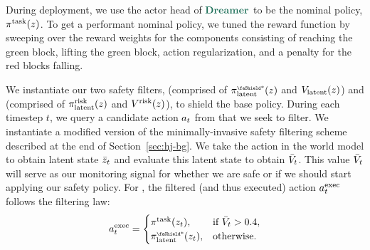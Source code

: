 During deployment, we use the actor head of $\dreamer$ to be the nominal policy, $\pi^{\text{task}}(z)$. 
To get a performant nominal policy, we tuned the \dreamer reward function by sweeping over the reward weights for the components consisting of reaching the green block, lifting the green block, action regularization, and a penalty for the red blocks falling.




We instantiate our two safety filters, \ours (comprised of $\fallbackLatent(\latent)$ and $V_{\textrm{latent}}(z)$) and \cmdp (comprised of $\pi^{\textrm{risk}}_{\textrm{latent}}(z)$ and $V^{\mathrm{risk}}(z)$), to shield the base \dreamer policy. 
During each timestep $t$, we query a candidate action $a_t$ from \dreamer that we seek to filter. 
We instantiate a modified version of the minimally-invasive safety filtering scheme described at the end of Section~\ref{sec:hj-bg}. We take the action in the world model to obtain latent state $\bar{z}_t$ and evaluate this latent state to obtain $\bar{V}_t$.
This value $\bar{V}_{t}$ will serve as our monitoring signal for whether we are safe or if we should start applying our safety policy.
For \ours, the filtered (and thus executed) action $a^\text{exec}_{t}$ follows the filtering law: 
\begin{align}
   \action^\text{exec}_{t} = 
    \begin{cases}
    \policyTask(\latent_t) ,& \text{if } \bar{V}_t > 0.4, \\
    \fallbackLatent(\latent_t),              & \text{otherwise.}  \\ 
    \end{cases}
\end{align}
